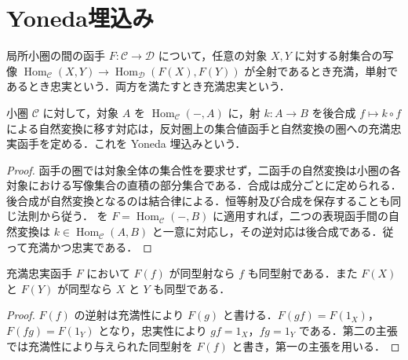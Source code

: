\section{Yoneda埋込み}
\begin{defn}[充満函手と忠実函手]
局所小圏の間の函手 $F:\mathcal C\to\mathcal D$ について，任意の対象 $X,Y$ に対する射集合の写像 $\operatorname{Hom}_{\mathcal C}(X,Y)\to\operatorname{Hom}_{\mathcal D}(F(X),F(Y))$ が全射であるとき充満，単射であるとき忠実という．両方を満たすとき充満忠実という．
\end{defn}
\begin{prop}[Yoneda埋込み]
小圏 $\mathcal C$ に対して，対象 $A$ を $\operatorname{Hom}_{\mathcal C}(-,A)$ に，射 $k:A\to B$ を後合成 $f\mapsto k\circ f$ による自然変換に移す対応は，反対圏上の集合値函手と自然変換の圏への充満忠実函手を定める．これを Yoneda 埋込みという．
\end{prop}
\begin{proof}
函手の圏では対象全体の集合性を要求せず，二函手の自然変換は小圏の各対象における写像集合の直積の部分集合である．合成は成分ごとに定められる．後合成が自然変換となるのは結合律による．恒等射及び合成を保存することも同じ法則から従う． を $F=\operatorname{Hom}_{\mathcal C}(-,B)$ に適用すれば，二つの表現函手間の自然変換は $k\in\operatorname{Hom}_{\mathcal C}(A,B)$ と一意に対応し，その逆対応は後合成である．従って充満かつ忠実である．
\end{proof}
\begin{prop}[充満忠実函手による同型の反映]
充満忠実函手 $F$ において $F(f)$ が同型射なら $f$ も同型射である．また $F(X)$ と $F(Y)$ が同型なら $X$ と $Y$ も同型である．
\end{prop}
\begin{proof}
$F(f)$ の逆射は充満性により $F(g)$ と書ける．$F(gf)=F(1_X)$，$F(fg)=F(1_Y)$ となり，忠実性により $gf=1_X$，$fg=1_Y$ である．第二の主張では充満性により与えられた同型射を $F(f)$ と書き，第一の主張を用いる．
\end{proof}
